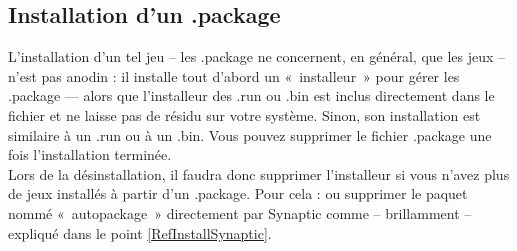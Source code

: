 \subsection{Installation d'un .package}
L'installation d'un tel jeu -- les .package ne concernent, en général, que les jeux -- n'est pas anodin : il installe tout d'abord un «~installeur~» pour gérer les .package --- alors que l'installeur des .run ou .bin est inclus directement dans le fichier et ne laisse pas de résidu sur votre système. Sinon, son installation est similaire à un .run ou à un .bin. Vous pouvez supprimer le fichier .package une fois l'installation terminée.\\
Lors de la désinstallation, il faudra donc supprimer l'installeur si vous n'avez plus de jeux installés à partir d'un .package. Pour cela :   ou supprimer le paquet nommé «~autopackage~» directement par Synaptic comme -- brillamment -- expliqué dans le point \ref{RefInstallSynaptic}.
